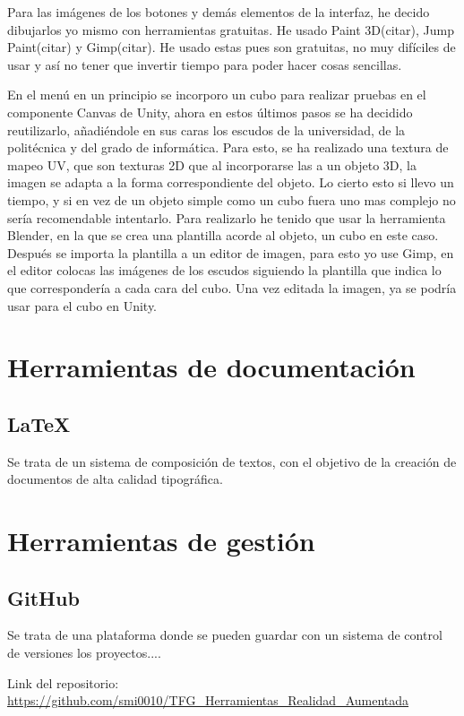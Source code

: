 Para las imágenes de los botones y demás elementos de la interfaz, he decido dibujarlos yo mismo con herramientas gratuitas. He usado Paint 3D(citar), Jump Paint(citar) y Gimp(citar). He usado estas pues son gratuitas, no muy difíciles de usar y así no tener que invertir tiempo para poder hacer cosas sencillas.



En el menú en un principio se incorporo un cubo para realizar pruebas en el componente Canvas de Unity, ahora en estos últimos pasos se ha decidido reutilizarlo, añadiéndole en sus caras los escudos de la universidad, de la politécnica y del grado de informática. Para esto, se ha realizado una textura de mapeo UV, que son texturas 2D que al incorporarse las a un objeto 3D, la imagen se adapta a la forma correspondiente del objeto. Lo cierto esto si llevo un tiempo, y si en vez de un objeto simple como un cubo fuera uno mas complejo no sería recomendable intentarlo. Para realizarlo he tenido que usar la herramienta Blender, en la que se crea una plantilla acorde al objeto, un cubo en este caso. Después se importa la plantilla a un editor de imagen, para esto yo use Gimp, en el editor colocas las imágenes de los escudos siguiendo la plantilla que indica lo que correspondería a cada cara del cubo. Una vez editada la imagen, ya se podría usar para el cubo en Unity.




\section{Herramientas de documentación}
\subsection{\LaTeX} 
Se trata de un sistema de composición de textos, con el objetivo de la creación de documentos de alta calidad tipográfica.
\section{Herramientas de gestión}
\subsection{GitHub}
Se trata de una plataforma donde se pueden guardar con un sistema de control de versiones los proyectos....

 Link del repositorio: \url{https://github.com/smi0010/TFG_Herramientas_Realidad_Aumentada}

